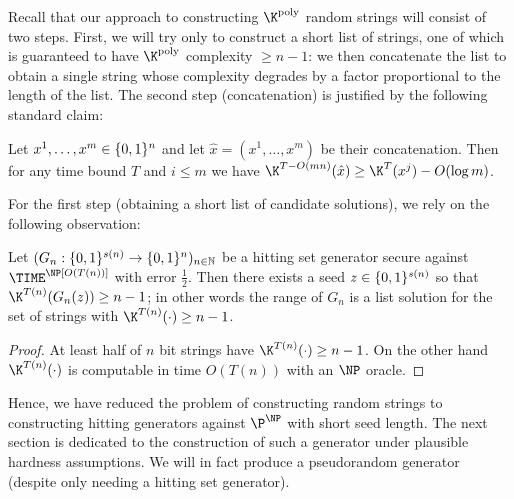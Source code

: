 
Recall that our approach to constructing $\K^{\poly}$ random strings will consist of two steps. First, we will try only to construct a short list of strings, one of which is guaranteed to have $\K^{\poly}$ complexity $\geq n-1$: we then concatenate the list to obtain a single string whose complexity degrades by a factor proportional to the length of the list. The second step (concatenation) is justified by the following standard claim:
\begin{observation}\label{randomstrings:obs:concat}
Let $x^1,\ldots,x^m \in \{0,1\}^n$ and let $\hat{x} = (x^1,\ldots,x^m)$ be their concatenation. Then for any time bound $T$ and $i \leq m$ we have $\K^{T - O(mn)}(\hat{x}) \geq \K^{T}(x^j) - O(\log m)$.
\end{observation}
For the first step (obtaining a short list of candidate solutions), we rely on the following observation:
\begin{observation}\label{randomstrings:obs:prg-avoid}
Let $(G_n: \{0,1\}^{s(n)} \to \{0,1\}^n)_{n \in \mathbb{N}}$ be a hitting set generator secure against $\TIME^\NP[O(T(n))]$ with error $\frac{1}{2}$. Then there exists a seed $z \in \{0,1\}^{s(n)}$ so that $\K^{T(n)}(G_n(z)) \geq n-1$; in other words the range of $G_n$ is a list solution for the set of strings with $\K^{T(n)}(\cdot) \geq n-1$.
\end{observation}

\begin{proof}
At least half of $n$ bit strings have $\K^{T(n)}(\cdot) \geq n-1$. On the other hand $\K^{T(n)}(\cdot)$ is computable in time $O(T(n))$ with an $\NP$ oracle. 
\end{proof}

Hence, we have reduced the problem of constructing random strings to constructing hitting generators against $\P^{\NP}$ with short seed length. The next section is dedicated to the construction of such a generator under plausible hardness assumptions. We will in fact produce a pseudorandom generator (despite only needing a hitting set generator).

